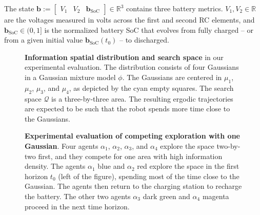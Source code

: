 \documentclass[letterpaper,10pt,conference,twoside]{IEEEtran}
\theoremstyle{definition}
\begin{document}
The state $\mathbf{b}:=\begin{bmatrix}V_1&V_2&\mathbf{b}_{\text{SoC}}\end{bmatrix}\in\mathbb{R}^3$ contains three battery metrics. $V_1,V_2\in\mathbb{R}$ are the voltages measured in volts across the first and second RC elements, and $\mathbf{b}_{\text{SoC}}\in(0,1]$ is the normalized battery SoC that evolves from fully charged -- or from a given initial value $\mathbf{b}_{\text{SoC}}(t_0)$ -- to discharged.



\begin{figure}[t!]
  \begin{minipage}[t!]{.5\columnwidth}
    \vspace*{-.2cm}
    
  \end{minipage}
  \begin{minipage}[c]{.48\columnwidth}
    \vspace*{.05cm}
    \caption{\textbf{Information spatial distribution and search space} in our experimental evaluation. The distribution consists of four Gaussians in a Gaussian mixture model $\phi$. The Gaussians are centered in $\mu_1$, $\mu_2$, $\mu_3$, and $\mu_4$, as depicted by the cyan empty squares. The search space $\mathcal{Q}$ is a three-by-three area. The resulting ergodic trajectories are expected to be such that the robot spends more time close to the Gaussians.}
    \label{fig:scenario}
  \end{minipage}
  \vspace*{-.15cm}
\end{figure}

\begin{figure}[b!]
  \vspace*{-.3cm}
  
  \caption{\textbf{Experimental evaluation of %
  competing exploration with one Gaussian}.
  Four agents $\alpha_1$, $\alpha_2$, $\alpha_3$, and $\alpha_4$ explore the space two-by-two first, and they compete for one area with high information density. The agents $\alpha_1$ blue and $\alpha_2$ red explore the space in the first horizon $t_0$ (left of the figure), spending most of the time close to the Gaussian. The agents then return to the charging station to recharge the battery. The other two agents $\alpha_3$ dark green and $\alpha_4$ magenta proceed in the next time horizon.}%
  \label{fig:res2}
\end{figure}
\end{document}
